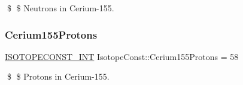 \$ \$ Neutrons in Cerium-\/155. \mbox{\label{group___isotope_const-_cerium-_ce155_gaac4ac86a736281059c4a9714d1657f51}} 
\subsubsection{\texorpdfstring{Cerium155\+Protons}{Cerium155Protons}}
{\footnotesize\ttfamily \mbox{\hyperlink{group___isotope_const-_macros_ga5f18360b3e99483a35c32d789e62621c}{I\+S\+O\+T\+O\+P\+E\+C\+O\+N\+S\+T\+\_\+\+I\+NT}} Isotope\+Const\+::\+Cerium155\+Protons = 58}

\$ \$ Protons in Cerium-\/155. 